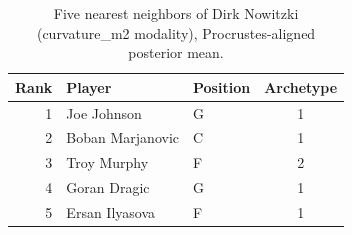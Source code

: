 \begin{table}[htbp]
  \centering\small
  \begin{tabular}{rllc}
    \toprule
    Rank & Player & Position & Archetype \\
    \midrule
    1 & Joe Johnson & G & 1 \\
    2 & Boban Marjanovic & C & 1 \\
    3 & Troy Murphy & F & 2 \\
    4 & Goran Dragic & G & 1 \\
    5 & Ersan Ilyasova & F & 1 \\
    \bottomrule
  \end{tabular}
  \caption{Five nearest neighbors of Dirk Nowitzki (curvature_m2 modality), Procrustes-aligned posterior mean.}
  \label{tab:Dirk_Nowitzki_neighbors_curvature_m2}
\end{table}

